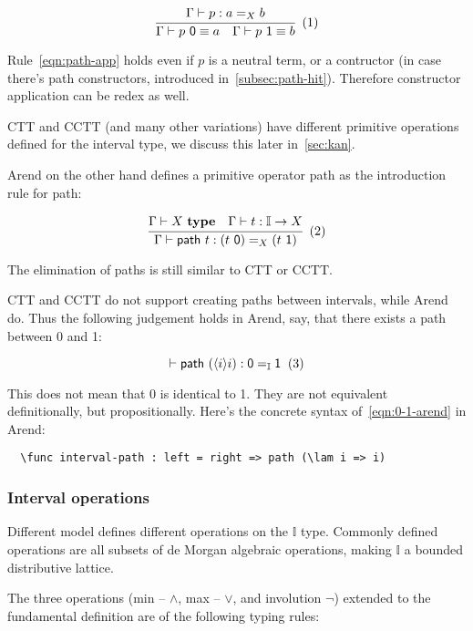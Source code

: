 \[
  \cfrac{
    \Gamma \vdash p : a =_X b
  }{
    \Gamma \vdash p~\textsf 0 \equiv a
    \quad
    \Gamma \vdash p~\textsf 1 \equiv b
  }
  \xtag \label{eqn:path-app}
\]

Rule~\ref{eqn:path-app} holds even if $p$ is a neutral term,
or a contructor (in case there's path constructors,
introduced in~\cref{subsec:path-hit}).
Therefore constructor application can be redex as well.

CTT and CCTT (and many other variations) have different primitive
operations defined for the interval type,
we discuss this later in~\cref{sec:kan}.

Arend on the other hand defines a primitive operator \textsf{path}
as the introduction rule for path:

\[
  \cfrac{
    \Gamma \vdash X~\textbf{type}
    \quad
    \Gamma \vdash t : \mathbb I \rightarrow X
  }{
    \Gamma \vdash \textsf{path}~t : (t~\textsf 0) =_X (t~\textsf 1)
  }
  \xtag
\]

The elimination of paths is still similar to CTT or CCTT.

CTT and CCTT do not support creating paths between intervals,
while Arend do.
Thus the following judgement holds in Arend, say,
that there exists a path between \textsf 0 and \textsf 1:

\[
  \vdash \textsf{path}~(\lrangle i i) : \textsf 0 =_{\mathbb I} \textsf 1
  \xtag \label{eqn:0-1-arend}
\]

This does not mean that \textsf 0 is identical to \textsf 1.
They are not equivalent definitionally, but propositionally.
Here's the concrete syntax of~\ref{eqn:0-1-arend} in Arend:

\begin{verbatim}
  \func interval-path : left = right => path (\lam i => i)
\end{verbatim}

\subsubsection{Interval operations}

Different model defines different operations on the $\mathbb I$ type.
Commonly defined operations are all subsets of de Morgan algebraic operations,
making $\mathbb I$ a bounded distributive lattice.

The three operations (min -- $\wedge$, max -- $\vee$, and involution $\neg$)
extended to the fundamental definition are of the following typing rules:


